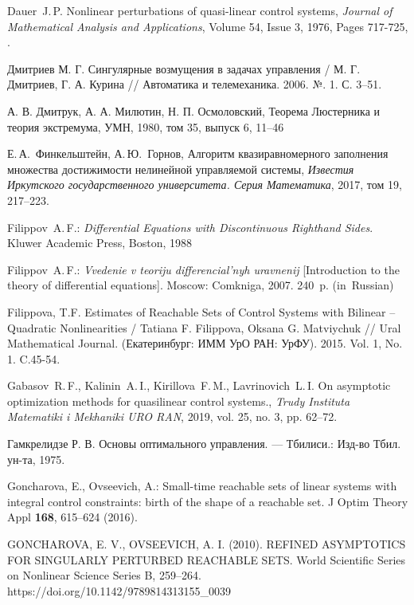 \documentclass[../main.tex]{subfiles}
\begin{document}
\begin{thebibliography}{99}
Dauer~J.\,P. Nonlinear perturbations of quasi-linear control systems,
\emph{Journal of Mathematical Analysis and Applications},
Volume 54, Issue 3,
1976,
Pages 717-725,
.

Дмитриев М. Г. Сингулярные возмущения в задачах управления / М. Г. Дмитриев, Г. А. Курина // Автоматика и телемеханика.  2006.  №. 1.  С. 3–51.

А. В. Дмитрук, А. А. Милютин, Н. П. Осмоловский, Теорема Люстерника и теория экстремума, УМН, 1980, том 35, выпуск 6, 11–46

Е.\,А.~Финкельштейн, А.\,Ю.~Горнов, Алгоритм квазиравномерного заполнения множества достижимости нелинейной управляемой системы, {\it Известия Иркутского государственного университета. Серия Математика}, 2017, том 19, 217–223.

Filippov~A.\,F.: \emph{Differential Equations with Discontinuous Righthand Sides}. Kluwer Academic Press, Boston, 1988

Filippov~A.\,F.: \emph{Vvedenie v teoriju differencial'nyh uravnenij} [Introduction to the theory of differential equations]. Moscow: Comkniga, 2007. 240~p. (in~Russian)

Filippova, T.F. Estimates of Reachable Sets of Control Systems with Bilinear – Quadratic Nonlinearities / Tatiana F. Filippova, Oksana G. Matviychuk // Ural Mathematical Journal. (Екатеринбург: ИММ УрО РАН: УрФУ). 2015. Vol. 1, No. 1. C.45-54. 

Gabasov~R.\,F., Kalinin~A.\,I.,  Kirillova~F.\,M., Lavrinovich~L.\,I. On asymptotic optimization methods for quasilinear control systems., \emph{Trudy Instituta Matematiki i Mekhaniki URO
    RAN}, 2019, vol. 25, no. 3, pp. 62–72.
    
    Гамкрелидзе Р. В. Основы оптимального управления. — Тбилиси.: Изд-во Тбил. ун-та, 1975.
    
  Goncharova, E., Ovseevich, A.: Small-time reachable sets of linear systems with integral control constraints: birth of the shape of a reachable set. J Optim Theory Appl \textbf{168}, 615--624 (2016).
  
  GONCHAROVA, E. V.,  OVSEEVICH, A. I. (2010). REFINED ASYMPTOTICS FOR SINGULARLY PERTURBED REACHABLE SETS. World Scientific Series on Nonlinear Science Series B, 259–264. https://doi.org/10.1142/9789814313155\_0039
    

\end{thebibliography}
\end{document}
